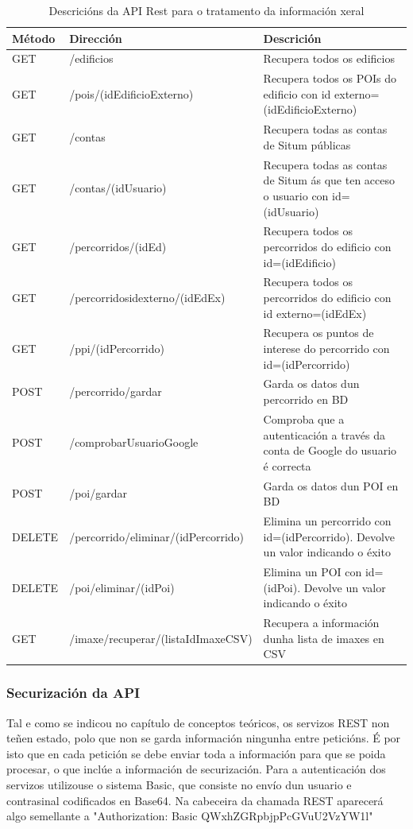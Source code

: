 \begin{table} [tbp]
	\begin{tabular}{|l|p{6cm}|p{6cm}|}
		\hline 
		\textbf{Método}	& \textbf{Dirección} & \textbf{Descrición} \\ 
		\hline 
		GET & /edificios & Recupera todos os edificios \\ 
		\hline 
		GET & /pois/(idEdificioExterno) & Recupera todos os POIs do edificio con id externo=(idEdificioExterno) \\ 
		\hline 
		GET & /contas & Recupera todas as contas de Situm públicas \\ 
		\hline 
		GET & /contas/(idUsuario) & Recupera todas as contas de Situm ás que ten acceso o usuario con id=(idUsuario) \\ 
		\hline 
		GET & /percorridos/(idEd) & Recupera todos os percorridos do edificio con id=(idEdificio) \\ 
		\hline 
		GET & /percorridosidexterno/(idEdEx) & Recupera todos os percorridos do edificio con id externo=(idEdEx) \\ 
		\hline 
		GET & /ppi/(idPercorrido) & Recupera os puntos de interese do percorrido con id=(idPercorrido) \\ 
		\hline 
		POST & /percorrido/gardar & Garda os datos dun percorrido en BD \\ 
		\hline 
		POST & /comprobarUsuarioGoogle & Comproba que a autenticación a través da conta de Google do usuario é correcta \\ 
		\hline 
		POST & /poi/gardar & Garda os datos dun POI en BD \\ 
		\hline 
		DELETE & /percorrido/eliminar/(idPercorrido) & Elimina un percorrido con id=(idPercorrido). Devolve un valor indicando o éxito \\ 
		\hline 
		DELETE & /poi/eliminar/(idPoi) & Elimina un POI con id=(idPoi). Devolve un valor indicando o éxito \\ 
		\hline 
		GET & /imaxe/recuperar/(listaIdImaxeCSV) & Recupera a información dunha lista de imaxes en CSV \\ 
		\hline 
	\end{tabular}
	\caption{Descricións da API Rest para o tratamento da información xeral}
	\label{tab:APIXeral}
\end{table}

\subsubsection{Securización da API}
Tal e como se indicou no capítulo de conceptos teóricos, os servizos REST non teñen estado, polo que non se garda información ningunha entre peticións. É por isto que en cada petición se debe enviar toda a información para que se poida procesar, o que inclúe a información de securización.
Para a autenticación dos servizos utilizouse o sistema Basic, que consiste no envío dun usuario e contrasinal codificados en Base64. Na cabeceira da chamada REST aparecerá algo semellante a "Authorization: Basic QWxhZGRpbjpPcGVuU2VzYW1l"


